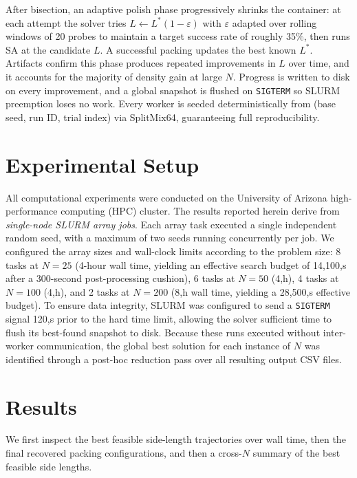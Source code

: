 \documentclass[10pt]{article}
\begin{document}
After bisection, an adaptive polish phase progressively shrinks the
container: at each attempt the solver tries $L \leftarrow L^*(1 -
\varepsilon)$ with $\varepsilon$ adapted over rolling windows of 20
probes to maintain a target success rate of roughly 35\%, then runs SA
at the candidate $L$. A successful packing updates the best known
$L^*$. Artifacts confirm this phase produces repeated improvements in
$L$ over time, and it accounts for the majority of density gain at
large $N$. Progress is written to disk on every improvement, and a
global snapshot is flushed on \texttt{SIGTERM} so SLURM preemption
loses no work. Every worker is seeded deterministically from (base
seed, run ID, trial index) via SplitMix64, guaranteeing full
reproducibility.
\section{Experimental Setup}
\label{sec:experiments}

All computational experiments were conducted on the University of
 Arizona high-performance computing (HPC) cluster.
  The results reported herein derive from
   \emph{single-node SLURM array jobs}.
    Each array task executed a single independent random seed,
     with a maximum of two seeds running concurrently per job. 
     We configured the array sizes and wall-clock limits according 
     to the problem size: 8 tasks at $N = 25$ 
     (4-hour wall time, yielding an effective search budget of
      14{,}100,s after a 300-second post-processing cushion),
       6 tasks at $N = 50$ (4,h), 4 tasks at $N = 100$ (4,h),
        and 2 tasks at $N = 200$ (8,h wall time, yielding a
         28{,}500,s effective budget). To ensure data integrity,
          SLURM was configured to send a \texttt{SIGTERM}
           signal 120,s prior to the hard time limit, allowing the solver
            sufficient time to flush its best-found snapshot to disk.
             Because these runs executed without inter-worker communication,
              the global best solution for each instance of $N$
               was identified through
 a post-hoc reduction pass over all resulting output CSV files.
\section{Results}
\label{sec:results}

We first inspect the best feasible side-length trajectories over wall time,
then the final recovered packing configurations, and then a cross-$N$
summary of the best feasible side lengths.
\end{document}
